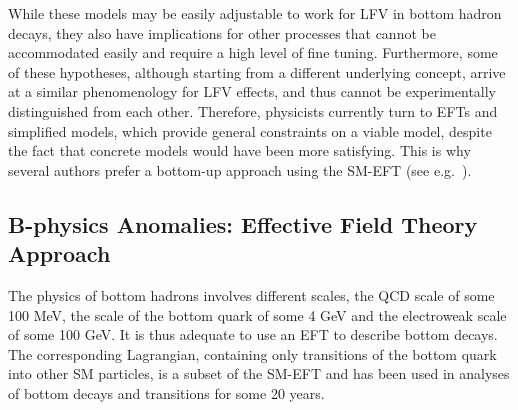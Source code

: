 While these models may be easily adjustable to work for LFV in 
bottom hadron decays, they also have implications for other processes
that cannot be accommodated easily and require a high level of fine
tuning. Furthermore, some of these hypotheses, although starting from
a different underlying concept, arrive at a similar phenomenology for 
LFV effects, and thus cannot be experimentally distinguished from each other. Therefore, physicists currently turn to EFTs and simplified models, which
provide general constraints on a viable model, %
despite the fact that concrete models would have been more satisfying.
This is why several authors prefer a bottom-up approach using the
SM-EFT (see e.g.~\citet{Buttazzo:2017ixm}).

\subsection{B-physics Anomalies: Effective Field Theory Approach}\label{sec:Bphysics}

The physics of bottom hadrons involves different scales, the QCD scale of
some 100 MeV, the scale of the bottom quark of some 4 GeV and the
electroweak scale of some 100 GeV. It is thus adequate to use an EFT to
describe bottom decays.  The corresponding Lagrangian, containing only
transitions of the bottom quark into other SM particles, is a subset
of the SM-EFT and has been used in analyses of bottom decays and
transitions for some 20 years.

